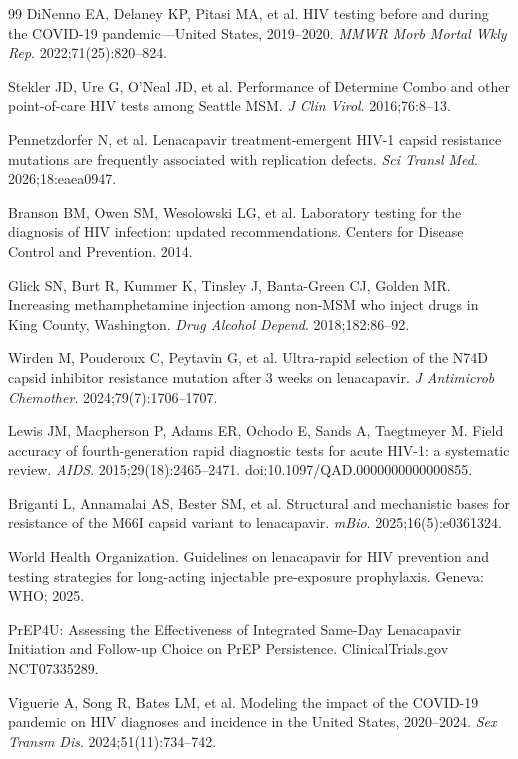 \documentclass[12pt]{article}
\begin{document}
\begin{thebibliography}{99}
 DiNenno EA, Delaney KP, Pitasi MA, et al. HIV testing before and during the COVID-19 pandemic---United States, 2019--2020. \textit{MMWR Morb Mortal Wkly Rep}. 2022;71(25):820--824.

 Stekler JD, Ure G, O'Neal JD, et al. Performance of Determine Combo and other point-of-care HIV tests among Seattle MSM. \textit{J Clin Virol}. 2016;76:8--13.

 Pennetzdorfer N, et al. Lenacapavir treatment-emergent HIV-1 capsid resistance mutations are frequently associated with replication defects. \textit{Sci Transl Med}. 2026;18:eaea0947.

 Branson BM, Owen SM, Wesolowski LG, et al. Laboratory testing for the diagnosis of HIV infection: updated recommendations. Centers for Disease Control and Prevention. 2014.

 Glick SN, Burt R, Kummer K, Tinsley J, Banta-Green CJ, Golden MR. Increasing methamphetamine injection among non-MSM who inject drugs in King County, Washington. \textit{Drug Alcohol Depend}. 2018;182:86--92.

 Wirden M, Pouderoux C, Peytavin G, et al. Ultra-rapid selection of the N74D capsid inhibitor resistance mutation after 3 weeks on lenacapavir. \textit{J Antimicrob Chemother}. 2024;79(7):1706--1707.

 Lewis JM, Macpherson P, Adams ER, Ochodo E, Sands A, Taegtmeyer M. Field accuracy of fourth-generation rapid diagnostic tests for acute HIV-1: a systematic review. \textit{AIDS}. 2015;29(18):2465--2471. doi:10.1097/QAD.0000000000000855.

 Briganti L, Annamalai AS, Bester SM, et al. Structural and mechanistic bases for resistance of the M66I capsid variant to lenacapavir. \textit{mBio}. 2025;16(5):e0361324.

 World Health Organization. Guidelines on lenacapavir for HIV prevention and testing strategies for long-acting injectable pre-exposure prophylaxis. Geneva: WHO; 2025.

 PrEP4U: Assessing the Effectiveness of Integrated Same-Day Lenacapavir Initiation and Follow-up Choice on PrEP Persistence. ClinicalTrials.gov NCT07335289.

 Viguerie A, Song R, Bates LM, et al. Modeling the impact of the COVID-19 pandemic on HIV diagnoses and incidence in the United States, 2020--2024. \textit{Sex Transm Dis}. 2024;51(11):734--742.


\end{thebibliography}
\end{document}

